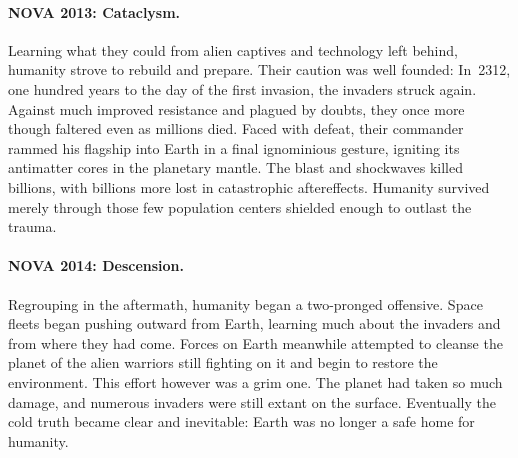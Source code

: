 \noindent\begin{minipage}[c]{(0.6\linewidth)-1em}%
\paragraph{NOVA 2013: Cataclysm.}  Learning what they could from alien
captives and technology left behind, humanity strove to rebuild and
prepare.  Their caution was well founded: In~2312, one hundred years
to the day of the first invasion, the invaders struck again.  Against
much improved resistance and plagued by doubts, they once more though
faltered even as millions died.  Faced with defeat, their commander
rammed his flagship into Earth in a final ignominious gesture,
igniting its antimatter cores in the planetary mantle.  The blast and
shockwaves killed billions, with billions more lost in catastrophic
aftereffects.  Humanity survived merely through those few population
centers shielded enough to outlast the trauma.

\bigskip
\paragraph{NOVA 2014: Descension.} Regrouping in the aftermath,
humanity began a two-pronged offensive.  Space fleets began pushing
outward from Earth, learning much about the invaders and from where
they had come.  Forces on Earth meanwhile attempted to cleanse the
planet of the alien warriors still fighting on it and begin to restore
the environment.  This effort however was a grim one.  The planet had
taken so much damage, and numerous invaders were still extant on the
surface.  Eventually the cold truth became clear and inevitable: Earth
was no longer a safe home for humanity.
\end{minipage}\hfill%
